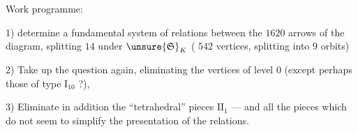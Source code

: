 Work programme:

1) determine a fundamental system of relations between the \(1620\) arrows of the diagram, splitting  \(14\)   under \(\unsure{\mathfrak S}_K\) ( \(542\) vertices, splitting into \(9\) orbits)



2) Take up the question again, eliminating the vertices of level \(0\) (except perhaps those of type \(\mathrm I_{10}\) ?),

3) Eliminate in addition the  ``tetrahedral'' pieces \(\mathrm{II}_1\) --- and all the pieces which do not seem to simplify the presentation of the relations.

